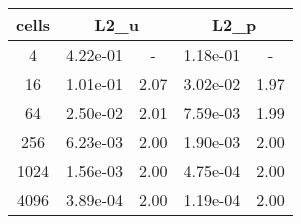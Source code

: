 \documentclass[10pt]{report}
\begin{document}
\begin{table}[H]
\begin{center}
\begin{tabular}{|c|c|c|c|c|} \hline
cells & 
\multicolumn{2}{|c|}{L2_u} & 
\multicolumn{2}{|c|}{L2_p}\\ \hline
4 & 4.22e-01 & - & 1.18e-01 & -\\ \hline
16 & 1.01e-01 & 2.07 & 3.02e-02 & 1.97\\ \hline
64 & 2.50e-02 & 2.01 & 7.59e-03 & 1.99\\ \hline
256 & 6.23e-03 & 2.00 & 1.90e-03 & 2.00\\ \hline
1024 & 1.56e-03 & 2.00 & 4.75e-04 & 2.00\\ \hline
4096 & 3.89e-04 & 2.00 & 1.19e-04 & 2.00\\ \hline
\end{tabular}
\end{center}
\end{table}
\end{document}
